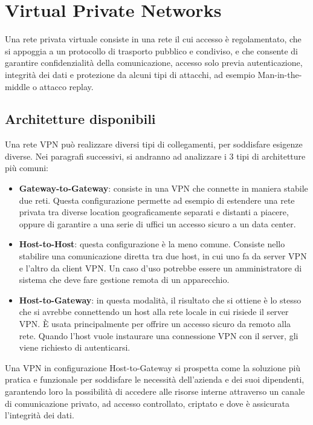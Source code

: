 \section{Virtual Private Networks}
Una rete privata virtuale consiste in una rete il cui accesso è regolamentato, che si appoggia a un protocollo di trasporto pubblico e condiviso, e che consente di garantire confidenzialità della comunicazione, accesso solo previa autenticazione, integrità dei dati e protezione da alcuni tipi di attacchi, ad esempio Man-in-the-middle o attacco replay.

\subsection{Architetture disponibili}
Una rete VPN può realizzare diversi tipi di collegamenti, per soddisfare esigenze diverse. Nei paragrafi successivi, si andranno ad analizzare i 3 tipi di architetture più comuni:
\begin{itemize}
    \item \textbf{Gateway-to-Gateway}: consiste in una VPN che connette in maniera stabile due reti. Questa configurazione permette ad esempio di estendere una rete privata tra diverse location geograficamente separati e distanti a piacere, oppure di garantire a una serie di uffici un accesso sicuro a un data center.
    \item \textbf{Host-to-Host}: questa configurazione è la meno comune. Consiste nello stabilire una comunicazione diretta tra due host, in cui uno fa da server VPN e l'altro da client VPN. Un caso d'uso potrebbe essere un amministratore di sistema che deve fare gestione remota di un apparecchio.
    \item \textbf{Host-to-Gateway}: in questa modalità, il risultato che si ottiene è lo stesso che si avrebbe connettendo un host alla rete locale in cui risiede il server VPN. È usata principalmente per offrire un accesso sicuro da remoto alla rete. Quando l'host vuole instaurare una connessione VPN con il server, gli viene richiesto di autenticarsi.
\end{itemize}

Una VPN in configurazione Host-to-Gateway si prospetta come la soluzione più pratica e funzionale per soddisfare le necessità dell'azienda e dei suoi dipendenti, garantendo loro la possibilità di accedere alle risorse interne attraverso un canale di comunicazione privato, ad accesso controllato, criptato e dove è assicurata l'integrità dei dati.

